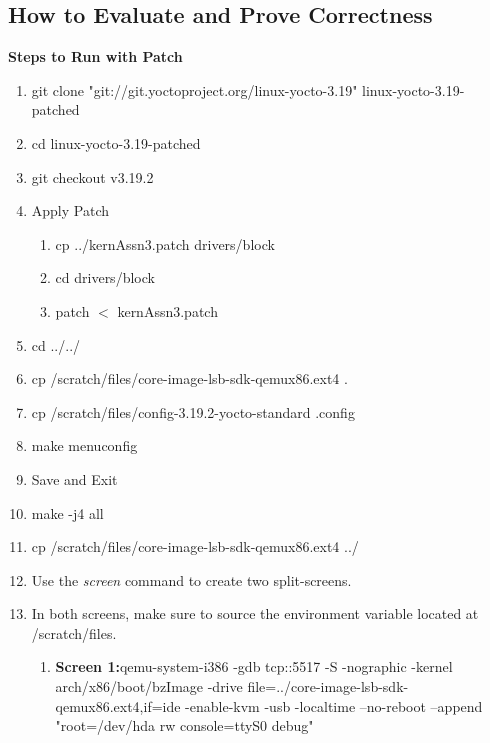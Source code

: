 \documentclass[draftclsnofoot, onecolumn, 10pt, compsoc]{IEEEtran}
\begin{document}
		\subsection{How to Evaluate and Prove Correctness}
			\textbf{Steps to Run with Patch}
			\begin{enumerate}
				\item git clone "git://git.yoctoproject.org/linux-yocto-3.19" linux-yocto-3.19-patched
				
				\item cd linux-yocto-3.19-patched
				
				\item git checkout v3.19.2
				
				\item Apply Patch
				\begin{enumerate}
					\item cp ../kernAssn3.patch drivers/block
				
					\item cd drivers/block
				
					\item patch $<$ kernAssn3.patch
				\end{enumerate}
				\item cd ../../
				
				\item cp /scratch/files/core-image-lsb-sdk-qemux86.ext4 .
				
				\item cp /scratch/files/config-3.19.2-yocto-standard .config
				
				\item make menuconfig
				
				\item Save and Exit
				
				\item make -j4 all
				
				\item cp /scratch/files/core-image-lsb-sdk-qemux86.ext4 ../
				
				\item Use the \textit{screen} command to create two split-screens.
				
				\item In both screens, make sure to source the environment variable located at /scratch/files.
				\begin{enumerate}
					\item{\textbf{Screen 1:}qemu-system-i386 -gdb tcp::5517 -S -nographic -kernel arch/x86/boot/bzImage -drive file=../core-image-lsb-sdk-qemux86.ext4,if=ide -enable-kvm -usb -localtime --no-reboot --append "root=/dev/hda rw console=ttyS0 debug"}
					

\end{enumerate}
\end{enumerate}
\end{document}

